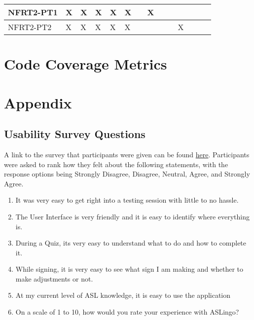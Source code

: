 \documentclass[12pt, titlepage]{article}
\begin{document}
\begin{table}[ht]
{\begin{tabular}{llllllllllllll}
\multicolumn{1}{|l|}{NFRT2-PT1}   & \multicolumn{1}{l|}{X}  & \multicolumn{1}{l|}{X}  & \multicolumn{1}{l|}{X}  & \multicolumn{1}{l|}{X}  & \multicolumn{1}{l|}{X}  & \multicolumn{1}{l|}{}  & \multicolumn{1}{l|}{X}  & \multicolumn{1}{l|}{}  & \multicolumn{1}{l|}{}  & \multicolumn{1}{l|}{}   & \multicolumn{1}{l|}{}  & \multicolumn{1}{l|}{}   & \multicolumn{1}{l|}{}   \\ \hline
\multicolumn{1}{|l|}{NFRT2-PT2}   & \multicolumn{1}{l|}{X}  & \multicolumn{1}{l|}{X}  & \multicolumn{1}{l|}{X}  & \multicolumn{1}{l|}{X}  & \multicolumn{1}{l|}{X}  & \multicolumn{1}{l|}{}  & \multicolumn{1}{l|}{}  & \multicolumn{1}{l|}{}  & \multicolumn{1}{l|}{}  & \multicolumn{1}{l|}{X}   & \multicolumn{1}{l|}{}  & \multicolumn{1}{l|}{}   & \multicolumn{1}{l|}{}   \\ \hline
\end{tabular}}
\end{table}

\section{Code Coverage Metrics}

% 
% 

\newpage{}

\section{Appendix}

\subsection{Usability Survey Questions} \label{appen}

A link to the survey that participants were given can be found \href{https://docs.google.com/forms/d/e/1FAIpQLSelcMIJ-egkwLc7gO8MhqO35-FpTtQ6efCKnogOOKVVsrdWNA/viewform}{here}. Participants were asked to rank how they felt about the following statements, with the response options being Strongly Disagree, Disagree, Neutral, Agree, and Strongly Agree. 

\begin{enumerate}
\item It was very easy to get right into a testing session with little to no hassle. 
\item The User Interface is very friendly and it is easy to identify where everything is.
\item During a Quiz, its very easy to understand what to do and how to complete it.
\item While signing, it is very easy to see what sign I am making and whether to make adjustments or not.
\item At my current level of ASL knowledge, it is easy to use the application
\item On a scale of 1 to 10, how would you rate your experience with ASLingo? \newline [ 1 = terrible, 10 = fantastic]
\end{enumerate}
\end{document}

